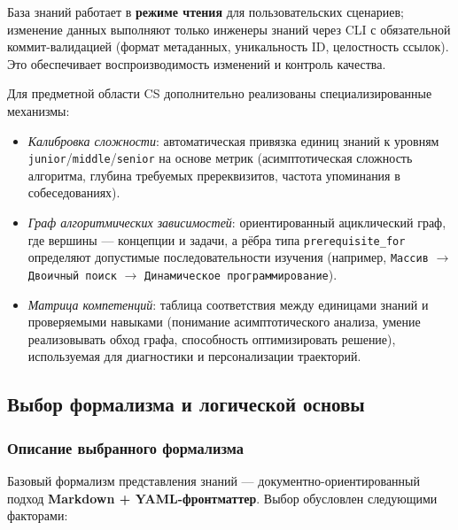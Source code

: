 База знаний работает в \textbf{режиме чтения} для пользовательских сценариев; изменение данных выполняют только инженеры знаний через CLI с обязательной коммит-валидацией (формат метаданных, уникальность ID, целостность ссылок). Это обеспечивает воспроизводимость изменений и контроль качества.

Для предметной области CS дополнительно реализованы специализированные механизмы:
\begin{itemize}
    \item \textit{Калибровка сложности}: автоматическая привязка единиц знаний к уровням \texttt{junior}/\texttt{middle}/\texttt{senior} на основе метрик (асимптотическая сложность алгоритма, глубина требуемых пререквизитов, частота упоминания в собеседованиях).
    \item \textit{Граф алгоритмических зависимостей}: ориентированный ациклический граф, где вершины — концепции и задачи, а рёбра типа \texttt{prerequisite\_for} определяют допустимые последовательности изучения (например, \texttt{Массив} $\rightarrow$ \texttt{Двоичный поиск} $\rightarrow$ \texttt{Динамическое программирование}).
    \item \textit{Матрица компетенций}: таблица соответствия между единицами знаний и проверяемыми навыками (понимание асимптотического анализа, умение реализовывать обход графа, способность оптимизировать решение), используемая для диагностики и персонализации траекторий.
\end{itemize}

\subsection{Выбор формализма и логической основы}

\subsubsection*{Описание выбранного формализма}


Базовый формализм представления знаний — документно-ориентированный подход \textbf{Markdown + YAML-фронтматтер}. Выбор обусловлен следующими факторами:

